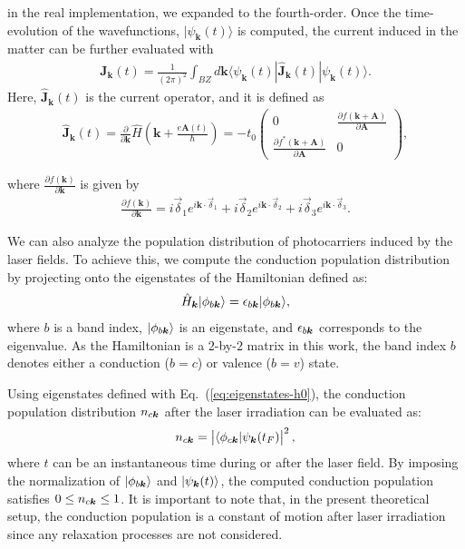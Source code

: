 in the real implementation, we expanded to the fourth-order.
Once the time-evolution of the wavefunctions, $|\psi_{\mathbf k}(t)\rangle$ is computed, the current induced in the matter can be further evaluated with
\begin{align}
	\mathbf{J}_{\mathbf k}(t)=\frac{1}{(2\pi)^2} \int_{BZ} d\mathbf k\langle \psi_{\mathbf k}(t)|\hat{\mathbf J}_{\mathbf k}(t)| \psi_{\mathbf{k}}(t)\rangle.
	\label{eq:current}
\end{align}
Here, $\hat {\mathbf J}_{\mathbf k}(t)$ is the current operator, and it is defined as
\begin{align}
	\hat {\mathbf J}_{\mathbf k}(t) = \frac{\partial }{\partial \mathbf k}\hat H \left (\mathbf k + \frac{e\mathbf A(t)}{\hbar} \right ) =
	-t_0 \left(\begin{array}{cc}
			           0                                                              & \frac{\partial f(\mathbf{k}+\mathbf{A})}{\partial \mathbf A} \\
			           \frac{\partial f^*(\mathbf{k}+\mathbf{A})}{\partial \mathbf A} & 0
		           \end{array}\right),
\end{align}

where $\frac{\partial f(\mathbf k)}{\partial \mathbf k}$ is given by
\begin{align}
	\frac{\partial f(\mathbf k)}{\partial \mathbf k}=i \overrightarrow{\delta}_1e^{i\mathbf k \cdot \overrightarrow\delta_1}
	+i \overrightarrow{\delta}_2e^{i\mathbf k \cdot \vec \delta_2}
	+i \overrightarrow{\delta}_3e^{i\mathbf k \cdot \overrightarrow\delta_3}.
\end{align}

We can also analyze the population distribution of photocarriers induced by the laser fields. To achieve this, we compute the conduction population distribution by projecting onto the eigenstates of the Hamiltonian defined as:
\begin{align}
	\hat{H}_{\boldsymbol{k}}|\phi_{b \boldsymbol{k}}\rangle = \epsilon_{b\boldsymbol{k}}|\phi_{b \boldsymbol{k}}\rangle,
	\label{eq:eigenstates-h0}
\end{align}
where $b$ is a band index, $|\phi_{b \boldsymbol{k}}\rangle$ is an eigenstate, and $\epsilon_{b\boldsymbol{k}}$ corresponds to the eigenvalue. As the Hamiltonian is a $2$-by-$2$ matrix in this work, the band index $b$ denotes either a conduction ($b=c$) or valence ($b=v$) state.

Using eigenstates defined with Eq.~(\ref{eq:eigenstates-h0}), the conduction population distribution $n_{c \boldsymbol{k}}$ after the laser irradiation can be evaluated as:
\begin{align}
	n_{c\boldsymbol{k}} = \left | \langle \phi_{c \boldsymbol{k}} | \psi_{\boldsymbol{k}}(t_F) \right |^2,
	\label{eq:population_tdse}
\end{align}
where $t$ can be an instantaneous time during or after the laser field. By imposing the normalization of $|\phi_{b \boldsymbol{k}}\rangle$ and $|\psi_{\boldsymbol{k}}(t)\rangle$, the computed conduction population satisfies $0\le n_{c \boldsymbol{k}}\le 1$. It is important to note that, in the present theoretical setup, the conduction population is a constant of motion after laser irradiation since any relaxation processes are not considered.

